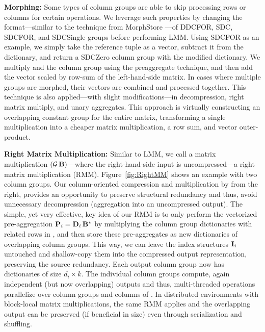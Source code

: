 \textbf{Morphing:} Some types of column groups are able to skip processing rows or columns for certain operations. We leverage such properties by changing the format---similar to the technique from MorphStore \cite{PattrickAJADW20}---of DDCFOR, SDC, SDCFOR, and SDCSingle groups before performing LMM. Using SDCFOR as an example, we simply take the reference tuple as a vector, subtract it from the dictionary, and return a SDCZero column group with the modified dictionary. We multiply  and the column group using the preaggregate technique, and then add the vector scaled by row-sum of the left-hand-side matrix. In cases where multiple groups are morphed, their vectors are combined and processed together. This technique is also applied---with slight modifications---in decompression, right matrix multiply, and unary aggregates. This approach is virtually constructing an overlapping constant group for the entire matrix, transforming a single multiplication into a cheaper matrix multiplication, a row sum, and vector outer-product.

\textbf{Right Matrix Multiplication:} Similar to LMM, we call a matrix multiplication $(\mathcal{G}\,\mathbf{B})$---where the right-hand-side input  is uncompressed---a right matrix multiplication (RMM). Figure~\ref{fig:RightMM} shows an example with two column groups. Our column-oriented compression and multiplication by  from the right, provides an opportunity to preserve structural redundancy and thus, avoid unnecessary decompression (aggregation into an uncompressed output). The simple, yet very effective, key idea of our RMM is to only perform the vectorized pre-aggregation $\mathbf{P}_i = \mathbf{D}_i\,\mathbf{B}^{*}$ by multiplying the column group dictionaries with related rows in , and then store these pre-aggregates as new dictionaries of overlapping column groups. This way, we can leave the index structures $\mathbf{I}_i$ untouched and shallow-copy them into the compressed output representation, preserving the source redundancy. Each output column group now has dictionaries of size $d_i \times k$. The individual column groups compute, again independent (but now overlapping) outputs and thus, multi-threaded operations parallelize over column groups and columns of . In distributed environments with block-local matrix multiplications, the same RMM applies and the overlapping output can be preserved (if beneficial in size) even through serialization and shuffling.

